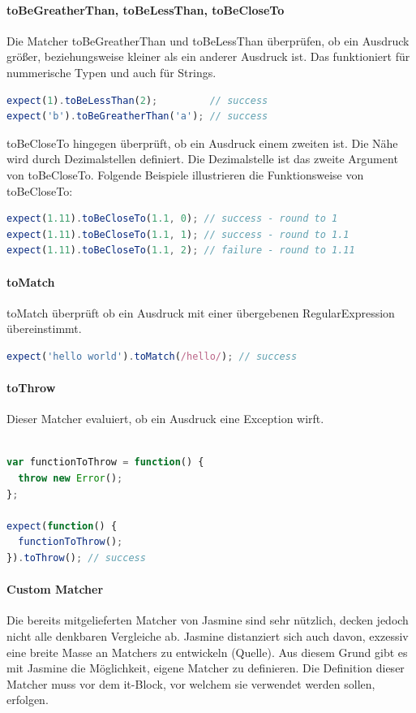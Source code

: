 \paragraph{toBeGreatherThan, toBeLessThan, toBeCloseTo}
Die Matcher toBeGreatherThan und toBeLessThan überprüfen, ob ein Ausdruck größer, beziehungsweise kleiner als ein anderer Ausdruck ist. Das funktioniert für nummerische Typen und auch für Strings.

\begin{lstlisting}[language=JavaScript]
expect(1).toBeLessThan(2);         // success
expect('b').toBeGreatherThan('a'); // success
\end{lstlisting}

toBeCloseTo hingegen überprüft, ob ein Ausdruck  einem zweiten ist. Die Nähe wird durch Dezimalstellen definiert. Die Dezimalstelle ist das zweite Argument von toBeCloseTo. Folgende Beispiele illustrieren die Funktionsweise von toBeCloseTo:

\begin{lstlisting}[language=JavaScript]
expect(1.11).toBeCloseTo(1.1, 0); // success - round to 1
expect(1.11).toBeCloseTo(1.1, 1); // success - round to 1.1
expect(1.11).toBeCloseTo(1.1, 2); // failure - round to 1.11
\end{lstlisting}

\paragraph{toMatch}
toMatch überprüft ob ein Ausdruck mit einer übergebenen RegularExpression übereinstimmt.

\begin{lstlisting}[language=JavaScript]
expect('hello world').toMatch(/hello/); // success
\end{lstlisting}

\paragraph{toThrow}
Dieser Matcher evaluiert, ob ein Ausdruck eine Exception wirft.

\begin{lstlisting}[language=JavaScript]

var functionToThrow = function() {
  throw new Error();
};

expect(function() {
  functionToThrow();
}).toThrow(); // success
\end{lstlisting}

\paragraph{Custom Matcher}
Die bereits mitgelieferten Matcher von Jasmine sind sehr nützlich, decken jedoch nicht alle denkbaren Vergleiche ab. Jasmine distanziert sich auch davon, exzessiv eine breite Masse an Matchers zu entwickeln (Quelle). Aus diesem Grund gibt es mit Jasmine die Möglichkeit, eigene Matcher zu definieren. Die Definition dieser Matcher muss vor dem it-Block, vor welchem sie verwendet werden sollen, erfolgen.

